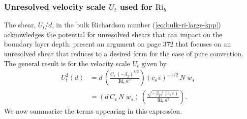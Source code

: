 \subsubsection{Unresolved velocity scale $U_{t}$ used for $\mbox{Ri}_{b}$}
\label{subsubsection:unresolved-shear}

The shear, $U_{t}/d$, in the bulk Richardson number
(\ref{eq:bulk-ri-large-kpp}) acknowledges the potential for unresolved
shears that can impact on the boundary layer depth.  \cite{LargeKPP}
present an argument on page 372 that focuses on an unresolved shear
that reduces to a desired form for the case of pure convection.  The
general result is for the velocity scale $U_{t}$ given by
\begin{subequations}
\begin{align}
 U_{t}^{2}(d) &= 
  d \, \left( \frac{C_{v} \,  (-\beta_{T})^{1/2}}{\mbox{Ri}_{c} \, \kappa^{2}} \right)
  (c_{s} \, \epsilon)^{-1/2} \, N \; w_{s}
 \\
 &= ( d \, C_{v} \, N \; w_{s} ) \, \left( \frac{ \sqrt{-\beta_{T} /  (c_{s} \, \epsilon) } }{ \, \mbox{Ri}_{c} \, \kappa^{2}} \right).
\label{eq:unresolved-shear-kpp}
\end{align}
\end{subequations}
We now summarize the terms appearing in this expression.
